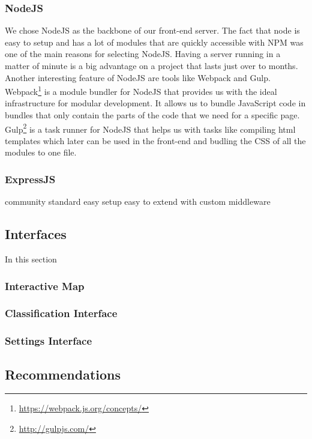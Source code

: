 \subsubsection{NodeJS}
We chose NodeJS as the backbone of our front-end server. The fact that node is easy to setup and has a lot of modules that are quickly accessible with NPM was one of the main reasons for selecting NodeJS. Having a server running in a matter of minute is a big advantage on a project that lasts just over to months.\\
Another interesting feature of NodeJS are tools like Webpack and Gulp. Webpack\footnote{\url{https://webpack.js.org/concepts/}} is a module bundler for NodeJS that provides us with the ideal infrastructure for modular development. It allows us to bundle JavaScript code in bundles that only contain the parts of the code that we need for a specific page. Gulp\footnote{\url{http://gulpjs.com/}} is a task runner for NodeJS that helps us with tasks like compiling html templates which later can be used in the front-end and budling the CSS of all the modules to one file.
\subsubsection{ExpressJS}

community standard
easy setup
easy to extend with custom middleware

\subsection{Interfaces}
In this section 
\subsubsection{Interactive Map}
\subsubsection{Classification Interface}
\subsubsection{Settings Interface}

\subsection{Recommendations}